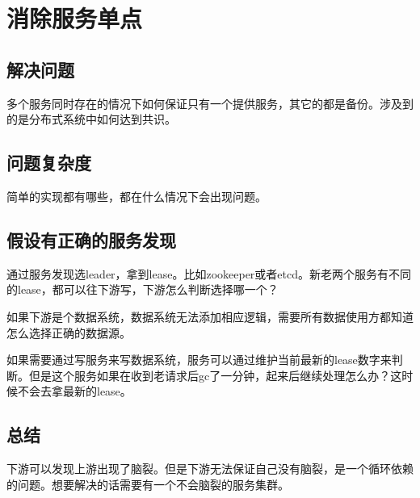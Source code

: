 \chapter{消除服务单点}


\section{解决问题}
多个服务同时存在的情况下如何保证只有一个提供服务，其它的都是备份。涉及到的是分布式系统中如何达到共识。

\section{问题复杂度}
简单的实现都有哪些，都在什么情况下会出现问题。

\section{假设有正确的服务发现}
通过服务发现选leader，拿到lease。比如zookeeper或者etcd。新老两个服务有不同的lease，都可以往下游写，下游怎么判断选择哪一个？

如果下游是个数据系统，数据系统无法添加相应逻辑，需要所有数据使用方都知道怎么选择正确的数据源。

如果需要通过写服务来写数据系统，服务可以通过维护当前最新的lease数字来判断。但是这个服务如果在收到老请求后gc了一分钟，起来后继续处理怎么办？这时候不会去拿最新的lease。

\section{总结}
下游可以发现上游出现了脑裂。但是下游无法保证自己没有脑裂，是一个循环依赖的问题。想要解决的话需要有一个不会脑裂的服务集群。
